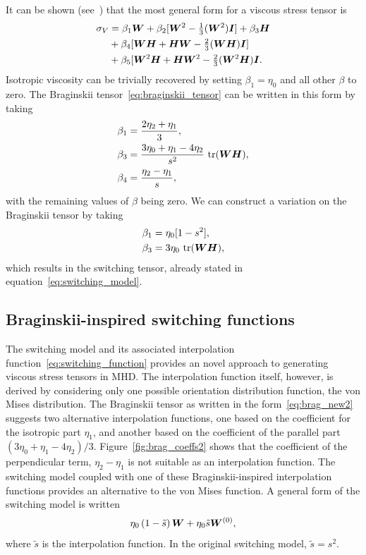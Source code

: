 It can be shown (see~\cite{mactaggartBraginskiiMagnetohydrodynamicsArbitrary2017}) that the most general form for a viscous stress tensor is
\begin{equation}
  \label{eq:general_viscous_stress_tensor}
  \begin{split}
\sigma_V &= \beta_1 {\bm W} + \beta_2 [ {\bm W}^2 - \tfrac{1}{3} ({\bm W}^2){\bm I}] + \beta_3 {\bm H}\\
&+ \beta_4 [ {\bm W} {\bm H} + {\bm H} {\bm W} - \tfrac{2}{3} ( {\bm W} {\bm H}) {\bm I}]\\
&+ \beta_5 [ {\bm W}^2 {\bm H} + {\bm H} {\bm W}^2 - \tfrac{2}{3} ( {\bm W}^2 {\bm H} ) {\bm I}.
  \end{split}
\end{equation}
Isotropic viscosity can be trivially recovered by setting $\beta_1 = \eta_0$ and all other $\beta$ to zero. The Braginskii tensor~\ref{eq:braginskii_tensor} can be written in this form by taking
\begin{align}
  \label{eq:brag_betas}
\beta_1 &= \frac{2 \eta_2 + \eta_1}{3},\\
\beta_3 &= \frac{3 \eta_0 + \eta_1 - 4\eta_2}{s^2} \ \text{tr}(\ten{W}\ten{H}),\\
\beta_4 &= \frac{\eta_2 - \eta_1}{s},
\end{align}
with the remaining values of $\beta$ being zero. We can construct a variation on the Braginskii tensor by taking
\begin{align}
  \label{eq:switching_betas}
\beta_1 &= \eta_0 [1 - s^2],\\
\beta_3 &= 3 \eta_0\ \text{tr}({\bm W} {\bm H}),
\end{align}
which results in the switching tensor, already stated in equation~\ref{eq:switching_model}.

\subsection{Braginskii-inspired switching functions}

The switching model and its associated interpolation function~\ref{eq:switching_function} provides an novel approach to generating viscous stress tensors in MHD. The interpolation function itself, however, is derived by considering only one possible orientation distribution function, the von Mises distribution. The Braginskii tensor as written in the form~\ref{eq:brag_new2} suggests two alternative interpolation functions, one based on the coefficient for the isotropic part $\eta_1$, and another based on the coefficient of the parallel part $(3\eta_0+\eta_1-4\eta_2)/3$. Figure~\ref{fig:brag_coeffs2} shows that the coefficient of the perpendicular term, $\eta_2 - \eta_1$ is not suitable as an interpolation function. The switching model coupled with one of these Braginskii-inspired interpolation functions provides an alternative to the von Mises function. A general form of the switching model is written
\begin{equation}
  \label{eq:general_switching_model}
\eta_0 \left( 1 - \tilde{s} \right) {\bm W} + \eta_0 \tilde{s}{\bm W}^{(0)},
\end{equation}
where $\tilde{s}$ is the interpolation function. In the original switching model, $\tilde{s} = s^2$.

